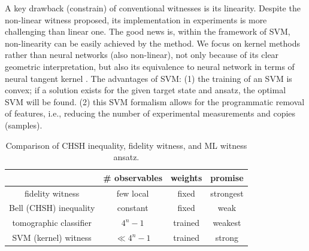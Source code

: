 \documentclass[
aps,
pra,
twocolumn,
floatfix,
]{revtex4-2}
\theoremstyle{plain}
\theoremstyle{definition}
\begin{document}
A key drawback (constrain) of conventional witnesses is its linearity.
Despite the non-linear witness \cite{guhneNonlinearEntanglementWitnesses2006} proposed, its implementation in experiments is more challenging than linear one.
The good news is,
within the framework of SVM, non-linearity can be easily achieved by the  method.
We focus on kernel methods rather than neural networks (also non-linear), 
not only because of its clear geometric interpretation, but also its equivalence to neural network in terms of neural tangent kernel \cite{jacotNeuralTangentKernel2020}.
The advantages of SVM: (1) the training of an SVM is convex; if a solution exists for the given target state and ansatz, the optimal SVM will be found.
(2) this SVM formalism allows for the programmatic removal of features, i.e., reducing the number of experimental measurements and copies (samples). 


\begin{table}[!ht]
	\centering
	\begin{tabular}{c|c|c|c}
		& \# observables & weights & promise \\
		\hline
		fidelity  witness & few local & fixed & strongest  \\  
		Bell (CHSH) inequality & constant & fixed & weak \\  
		tomographic classifier & $4^n-1$ & trained & weakest \\  
		SVM (kernel) witness &  $\ll 4^n-1$ & trained & strong \\  
		\hline
	\end{tabular}
	\caption{Comparison of CHSH inequality, fidelity witness, and ML witness ansatz.}
\end{table}
\end{document}
